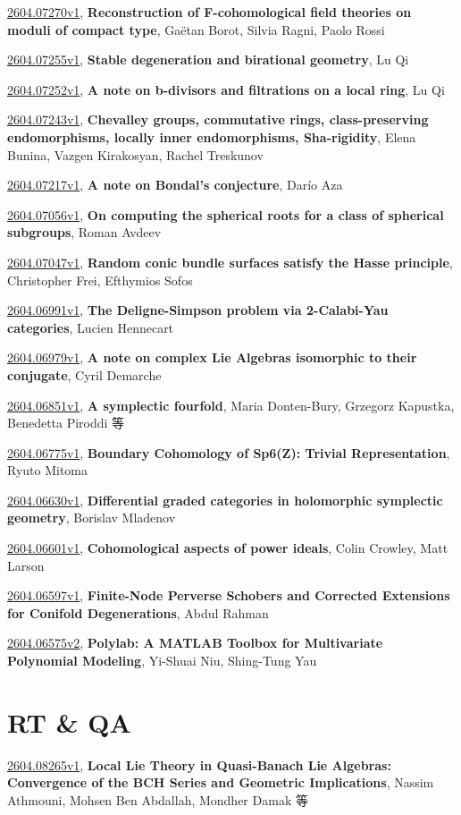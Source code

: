 \documentclass[9pt, a4paper]{article}
\theoremstyle{plain}
\theoremstyle{definition}
\theoremstyle{remark}
\newcommand{\arxiv}[3]{\href{https://arxiv.org/abs/#1}{#1}, \textbf{\textcolor{arxivblue}{#2}}, #3}
\begin{document}
\arxiv{2604.07270v1}{Reconstruction of F-cohomological field theories on moduli of compact type}{Gaëtan Borot, Silvia Ragni, Paolo Rossi}

\arxiv{2604.07255v1}{Stable degeneration and birational geometry}{Lu Qi}

\arxiv{2604.07252v1}{A note on b-divisors and filtrations on a local ring}{Lu Qi}

\arxiv{2604.07243v1}{Chevalley groups, commutative rings, class-preserving endomorphisms, locally inner endomorphisms, Sha-rigidity}{Elena Bunina, Vazgen Kirakosyan, Rachel Treskunov}

\arxiv{2604.07217v1}{A note on Bondal's conjecture}{Darío Aza}

\arxiv{2604.07056v1}{On computing the spherical roots for a class of spherical subgroups}{Roman Avdeev}

\arxiv{2604.07047v1}{Random conic bundle surfaces satisfy the Hasse principle}{Christopher Frei, Efthymios Sofos}

\arxiv{2604.06991v1}{The Deligne-Simpson problem via 2-Calabi-Yau categories}{Lucien Hennecart}

\arxiv{2604.06979v1}{A note on complex Lie Algebras isomorphic to their conjugate}{Cyril Demarche}

\arxiv{2604.06851v1}{A symplectic fourfold}{Maria Donten-Bury, Grzegorz Kapustka, Benedetta Piroddi 等}

\arxiv{2604.06775v1}{Boundary Cohomology of Sp6(Z): Trivial Representation}{Ryuto Mitoma}

\arxiv{2604.06630v1}{Differential graded categories in holomorphic symplectic geometry}{Borislav Mladenov}

\arxiv{2604.06601v1}{Cohomological aspects of power ideals}{Colin Crowley, Matt Larson}

\arxiv{2604.06597v1}{Finite-Node Perverse Schobers and Corrected Extensions for Conifold Degenerations}{Abdul Rahman}

\arxiv{2604.06575v2}{Polylab: A MATLAB Toolbox for Multivariate Polynomial Modeling}{Yi-Shuai Niu, Shing-Tung Yau}


\section{RT \& QA}
\arxiv{2604.08265v1}{Local Lie Theory in Quasi-Banach Lie Algebras: Convergence of the BCH Series and Geometric Implications}{Nassim Athmouni, Mohsen Ben Abdallah, Mondher Damak 等}
\end{document}

